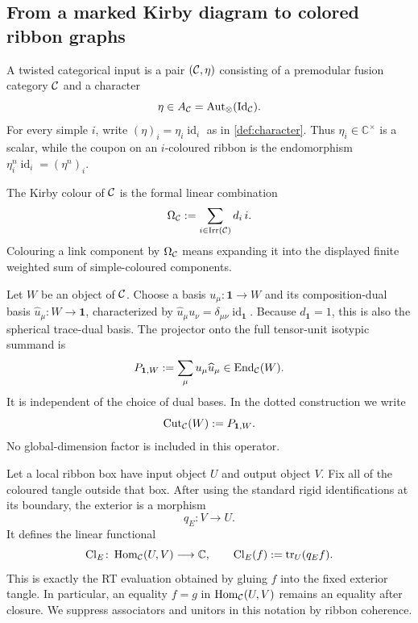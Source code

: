 \subsection{From a marked Kirby diagram to colored ribbon graphs}
\label{subsec:graphical-construction}

\begin{definition}
\label{def:twisted-categorical-input}
A twisted categorical input is a pair $(\mathcal{C},\eta)$ consisting of a
premodular fusion category $\mathcal{C}$ and a character
\[
  \eta\in A_{\mathcal{C}}
  =\operatorname{Aut}_{\otimes}(\operatorname{Id}_{\mathcal{C}}).
\]
For every simple $i$, write
$(\eta)_i=\eta_i\operatorname{id}_i$ as in
\cref{def:character}.  Thus $\eta_i\in\mathbb C^\times$ is a scalar, while
the coupon on an $i$-coloured ribbon is the endomorphism
$\eta_i^n\operatorname{id}_i=(\eta^n)_i$.
\end{definition}

\begin{definition}
\label{def:kirby-colour}
The Kirby colour of $\mathcal{C}$ is the formal linear combination
\[
  \Omega_{\mathcal{C}}:=
    \sum_{i\in\operatorname{Irr}(\mathcal{C})}d_i\,i.
\]
Colouring a link component by $\Omega_{\mathcal{C}}$ means expanding it into the
displayed finite weighted sum of simple-coloured components.
\end{definition}

\begin{definition}
\label{def:tensor-unit-projector}
Let $W$ be an object of $\mathcal{C}$.  Choose a basis
$u_\mu\colon\mathbf1\to W$ and its composition-dual basis
$\widehat u_\mu\colon W\to\mathbf1$, characterized by
$\widehat u_\mu u_\nu=\delta_{\mu\nu}\operatorname{id}_{\mathbf1}$.
Because $d_{\mathbf1}=1$, this is also the spherical trace-dual basis.  The
projector onto the full
tensor-unit isotypic summand is
\[
  P_{\mathbf1,W}:=\sum_\mu u_\mu\widehat u_\mu
  \in\operatorname{End}_{\mathcal{C}}(W).
\]
It is independent of the choice of dual bases.  In the dotted construction
we write
\[
  \operatorname{Cut}_{\mathcal{C}}(W):=P_{\mathbf1,W}.
\]
No global-dimension factor is included in this operator.
\end{definition}

\begin{definition}
\label{def:exterior-closure-context}
Let a local ribbon box have input object $U$ and output object $V$.  Fix all
of the coloured tangle outside that box.  After using the standard rigid
identifications at its boundary, the exterior is a morphism
\[
  q_E\colon V\longrightarrow U.
\]
It defines the linear functional
\[
  \operatorname{Cl}_E\colon
  \operatorname{Hom}_{\mathcal{C}}(U,V)\longrightarrow\mathbb C,
  \qquad
  \operatorname{Cl}_E(f):=\operatorname{tr}_U(q_Ef).
\]
This is exactly the RT evaluation obtained by gluing $f$ into the fixed
exterior tangle.  In particular, an equality $f=g$ in
$\operatorname{Hom}_{\mathcal{C}}(U,V)$ remains an equality after closure.  We
suppress associators and unitors in this notation by ribbon coherence.
\end{definition}

